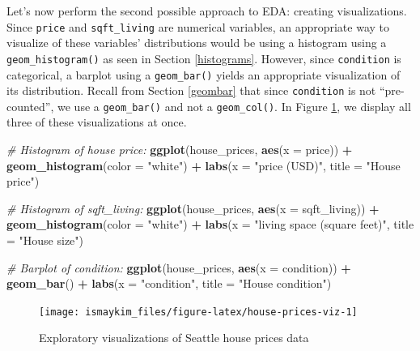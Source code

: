 \documentclass[12pt, krantz2,]{krantz}
\makeatletter
\newenvironment{Shaded}{\begin{snugshade}}{\end{snugshade}}
\newcommand{\CommentTok}[1]{\textcolor[rgb]{0.37,0.37,0.37}{\textit{#1}}}
\newcommand{\DataTypeTok}[1]{\textcolor[rgb]{0.27,0.27,0.27}{#1}}
\newcommand{\KeywordTok}[1]{\textcolor[rgb]{0.27,0.27,0.27}{\textbf{#1}}}
\newcommand{\NormalTok}[1]{#1}
\newcommand{\OperatorTok}[1]{\textcolor[rgb]{0.43,0.43,0.43}{\textbf{#1}}}
\newcommand{\StringTok}[1]{\textcolor[rgb]{0.5,0.5,0.5}{#1}}
\newenvironment{kframe}{%
\medskip{}
\setlength{\fboxsep}{.8em}
 \def\at@end@of@kframe{}%
 \ifinner\ifhmode%
  \def\at@end@of@kframe{\end{minipage}}%
  \begin{minipage}{\columnwidth}%
 \fi\fi%
 \def\FrameCommand##1{\hskip\@totalleftmargin \hskip-\fboxsep
 \colorbox{shadecolor}{##1}\hskip-\fboxsep
     \hskip-\linewidth \hskip-\@totalleftmargin \hskip\columnwidth}%
 \MakeFramed {\advance\hsize-\width
   \@totalleftmargin\z@ \linewidth\hsize
   \@setminipage}}%
 {\par\unskip\endMakeFramed%
 \at@end@of@kframe}
\renewenvironment{Shaded}{\begin{kframe}}{\end{kframe}}
\makeatother
\begin{document}
Let's now perform the second possible approach to EDA: creating visualizations. Since \texttt{price} and \texttt{sqft\_living} are numerical variables, an appropriate way to visualize of these variables' distributions would be using a histogram using a \texttt{geom\_histogram()} as seen in Section \ref{histograms}. However, since \texttt{condition} is categorical, a barplot using a \texttt{geom\_bar()} yields an appropriate visualization of its distribution. Recall from Section \ref{geombar} that since \texttt{condition} is not ``pre-counted'', we use a \texttt{geom\_bar()} and not a \texttt{geom\_col()}. In Figure \ref{fig:house-prices-viz}, we display all three of these visualizations at once.

\begin{Shaded}
\begin{Highlighting}[]
\CommentTok{# Histogram of house price:}
\KeywordTok{ggplot}\NormalTok{(house_prices, }\KeywordTok{aes}\NormalTok{(}\DataTypeTok{x =}\NormalTok{ price)) }\OperatorTok{+}
\StringTok{  }\KeywordTok{geom_histogram}\NormalTok{(}\DataTypeTok{color =} \StringTok{"white"}\NormalTok{) }\OperatorTok{+}
\StringTok{  }\KeywordTok{labs}\NormalTok{(}\DataTypeTok{x =} \StringTok{"price (USD)"}\NormalTok{, }\DataTypeTok{title =} \StringTok{"House price"}\NormalTok{)}

\CommentTok{# Histogram of sqft_living:}
\KeywordTok{ggplot}\NormalTok{(house_prices, }\KeywordTok{aes}\NormalTok{(}\DataTypeTok{x =}\NormalTok{ sqft_living)) }\OperatorTok{+}
\StringTok{  }\KeywordTok{geom_histogram}\NormalTok{(}\DataTypeTok{color =} \StringTok{"white"}\NormalTok{) }\OperatorTok{+}
\StringTok{  }\KeywordTok{labs}\NormalTok{(}\DataTypeTok{x =} \StringTok{"living space (square feet)"}\NormalTok{, }\DataTypeTok{title =} \StringTok{"House size"}\NormalTok{)}

\CommentTok{# Barplot of condition:}
\KeywordTok{ggplot}\NormalTok{(house_prices, }\KeywordTok{aes}\NormalTok{(}\DataTypeTok{x =}\NormalTok{ condition)) }\OperatorTok{+}
\StringTok{  }\KeywordTok{geom_bar}\NormalTok{() }\OperatorTok{+}
\StringTok{  }\KeywordTok{labs}\NormalTok{(}\DataTypeTok{x =} \StringTok{"condition"}\NormalTok{, }\DataTypeTok{title =} \StringTok{"House condition"}\NormalTok{)}
\end{Highlighting}
\end{Shaded}

\begin{figure}

{\centering \texttt{[image: ismaykim\_files/figure-latex/house-prices-viz-1]} 

}

\caption{Exploratory visualizations of Seattle house prices data}\label{fig:house-prices-viz}
\end{figure}
\end{document}
